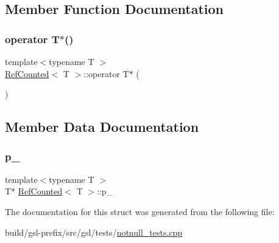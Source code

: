\subsection{Member Function Documentation}
\mbox{\label{structRefCounted_af2c476a22394d788e365eb7d2bb38fe8}} 
\subsubsection{\texorpdfstring{operator T$\ast$()}{operator T*()}}
{\footnotesize\ttfamily template$<$typename T $>$ \\
\hyperlink{structRefCounted}{Ref\+Counted}$<$ T $>$\+::operator T$\ast$ (\begin{DoxyParamCaption}{ }\end{DoxyParamCaption})\hspace{0.3cm}{\ttfamily [inline]}}



\subsection{Member Data Documentation}
\mbox{\label{structRefCounted_a5486e2d0954f6462a8619cabfaf8fb27}} 
\subsubsection{\texorpdfstring{p\+\_\+}{p\_}}
{\footnotesize\ttfamily template$<$typename T $>$ \\
T$\ast$ \hyperlink{structRefCounted}{Ref\+Counted}$<$ T $>$\+::p\+\_\+}



The documentation for this struct was generated from the following file\+:\begin{DoxyCompactItemize}
\item 
build/gsl-\/prefix/src/gsl/tests/\hyperlink{notnull__tests_8cpp}{notnull\+\_\+tests.\+cpp}\end{DoxyCompactItemize}

